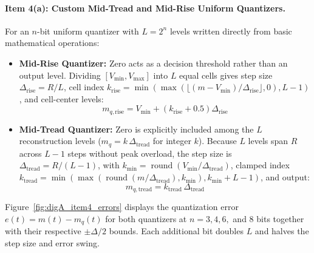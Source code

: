 \documentclass[a4paper]{article}
\begin{document}
\paragraph{Item 4(a): Custom Mid-Tread and Mid-Rise Uniform Quantizers.}
For an $n$-bit uniform quantizer with $L = 2^n$ levels written directly from basic mathematical operations:
\begin{itemize}
    \item \textbf{Mid-Rise Quantizer:} Zero acts as a decision threshold rather than an output level. Dividing $[V_{\min}, V_{\max}]$ into $L$ equal cells gives step size $\Delta_{\text{rise}} = R / L$, cell index $k_{\text{rise}} = \min(\max(\lfloor (m - V_{\min})/\Delta_{\text{rise}} \rfloor, 0), L-1)$, and cell-center levels:
    \begin{equation}
    m_{q,\text{rise}} = V_{\min} + \left(k_{\text{rise}} + 0.5\right)\Delta_{\text{rise}}
    \end{equation}
    \item \textbf{Mid-Tread Quantizer:} Zero is explicitly included among the $L$ reconstruction levels ($m_q = k\,\Delta_{\text{tread}}$ for integer $k$). Because $L$ levels span $R$ across $L - 1$ steps without peak overload, the step size is $\Delta_{\text{tread}} = R / (L - 1)$, with $k_{\min} = \operatorname{round}(V_{\min}/\Delta_{\text{tread}})$, clamped index $k_{\text{tread}} = \min(\max(\operatorname{round}(m/\Delta_{\text{tread}}), k_{\min}), k_{\min}+L-1)$, and output:
    \begin{equation}
    m_{q,\text{tread}} = k_{\text{tread}}\,\Delta_{\text{tread}}
    \end{equation}
\end{itemize}

Figure~\ref{fig:digA_item4_errors} displays the quantization error $e(t) = m(t) - m_q(t)$ for both quantizers at $n = 3, 4, 6,$ and $8$ bits together with their respective $\pm\Delta/2$ bounds. Each additional bit doubles $L$ and halves the step size and error swing.
\end{document}
